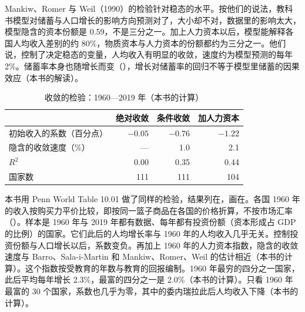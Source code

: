 Mankiw、Romer 与 Weil（1990）的检验针对稳态的水平\cite{mrw1990}。按他们的说法，教科书模型对储蓄与人口增长的影响方向预测对了，大小却不对，数据里的影响太大，模型隐含的资本份额是 0.59，不是三分之一\cite{mrw1990}。加上人力资本以后，模型能解释各国人均收入差别的约 80\%，物质资本与人力资本的份额都约为三分之一\cite{mrw1990}。他们说，控制了决定稳态的变量，人均收入有明显的收敛，速度约为模型预测的每年 2\%\cite{mrw1990}。储蓄率本身也随增长而变（），增长对储蓄率的回归不等于模型里储蓄的因果效应（本书的解读）。

\begin{table}[tbp]
\centering\small
\caption{收敛的检验：1960—2019 年（本书的计算）}\label{tab:solow-convergence}
\begin{tabularx}{\linewidth}{@{}Y r r r@{}}
\toprule
 & 绝对收敛 & 条件收敛 & 加人力资本 \\
\midrule
初始收入的系数（百分点） & $-0.05$ & $-0.76$ & $-1.22$ \\
隐含的收敛速度（\%） & — & 1.0 & 2.1 \\
$R^{2}$ & 0.00 & 0.35 & 0.44 \\
国家数 & 111 & 111 & 104 \\
\bottomrule
\end{tabularx}
\end{table}

本书用 Penn World Table 10.01 做了同样的检验，结果列在，画在\cite{pwt1001}。各国 1960 年的收入按购买力平价比较，即按同一篮子商品在各国的价格折算，不按市场汇率（）。样本是 1960 年与 2019 年都有数据、每年都有投资份额（资本形成占 GDP 的比例）的国家。它们此后的人均增长率与 1960 年的人均收入几乎无关。控制投资份额与人口增长以后，系数变负。再加上 1960 年的人力资本指数，隐含的收敛速度与 Barro、Sala-i-Martin 和 Mankiw、Romer、Weil 的估计相近（本书的计算）。这个指数按受教育的年数与教育的回报编制\cite{pwt1001}。1960 年最穷的四分之一国家，此后平均每年增长 2.3\%，最富的四分之一是 2.0\%（本书的计算）。只看 1960 年最富的 30 个国家，系数也几乎为零，其中的委内瑞拉此后人均收入下降（本书的计算）。

